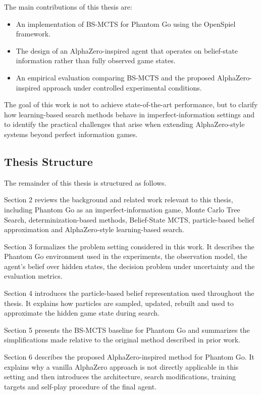 \documentclass[12pt,oneside,openright]{article}
\begin{document}
The main contributions of this thesis are:

\begin{itemize}
  \item An implementation of BS-MCTS for Phantom Go using the OpenSpiel framework.
  \item The design of an AlphaZero-inspired agent that operates on belief-state information rather than fully observed game states.
  \item An empirical evaluation comparing BS-MCTS and the proposed AlphaZero-inspired approach under controlled experimental conditions.
\end{itemize}

The goal of this work is not to achieve state-of-the-art performance, but to clarify how learning-based search methods behave in imperfect-information settings and to identify the practical challenges that arise when extending AlphaZero-style systems beyond perfect information games.


\subsection{Thesis Structure}

The remainder of this thesis is structured as follows.

Section 2 reviews the background and related work relevant to this thesis, including Phantom Go as an imperfect-information game, Monte Carlo Tree Search, determinization-based methods, Belief-State MCTS, particle-based belief approximation and AlphaZero-style learning-based search.

Section 3 formalizes the problem setting considered in this work. It describes the Phantom Go environment used in the experiments, the observation model, the agent's belief over hidden states, the decision problem under uncertainty and the evaluation metrics.

Section 4 introduces the particle-based belief representation used throughout the thesis. It explains how particles are sampled, updated, rebuilt and used to approximate the hidden game state during search.

Section 5 presents the BS-MCTS baseline for Phantom Go and summarizes the simplifications made relative to the original method described in prior work.

Section 6 describes the proposed AlphaZero-inspired method for Phantom Go. It explains why a vanilla AlphaZero approach is not directly applicable in this setting and then introduces the architecture, search modifications, training targets and self-play procedure of the final agent.
\end{document}
